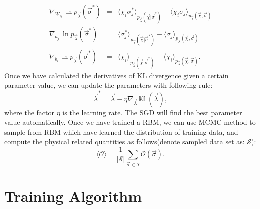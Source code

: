 \documentclass[letterpaper, 10pt]{article}
\newcommand{\qbar}{\rangle}
\newcommand{\qket}{\langle}
\begin{document}
\begin{eqnarray}
\nabla_{W_{ij}} \, \ln{p_{\vec{\lambda}}(\vec{\sigma}^*)} & = & \qket \chi_i \sigma_j^* \qbar_{{p_{\vec{\lambda}}(\vec{\chi} | \vec{\sigma}^*)}} - \qket \chi_i \sigma_j \qbar_{{p_{\vec{\lambda}}(\vec{\chi},\vec{\sigma})}}\label{eq:eq4} \\
\nabla_{a_j} \, \ln{p_{\vec{\lambda}}(\vec{\sigma}^*)} & = & \qket \sigma_j^* \qbar_{{p_{\vec{\lambda}}(\vec{\chi} | \vec{\sigma}^*)}} - \qket \sigma_j \qbar_{{p_{\vec{\lambda}}(\vec{\chi},\vec{\sigma})}}\label{eq:eq5} \\
\nabla_{b_i} \, \ln{p_{\vec{\lambda}}(\vec{\sigma}^*)} & = & \qket \chi_i \qbar_{{p_{\vec{\lambda}}(\vec{\chi} | \vec{\sigma}^*)}} - \qket \chi_i \qbar_{{p_{\vec{\lambda}}(\vec{\chi},\vec{\sigma})}}.\label{eq:eq6}
\end{eqnarray}
Once we have calculated the derivatives of KL divergence given a certain parameter value, we can update the parameters with following rule:
\[ \vec{\lambda}^* = \vec{\lambda} - \eta \nabla_{\vec{\lambda}} \, \mathbb{KL}(\vec{\lambda}), \]
where the factor $\eta$ is the learning rate. The SGD will find the best parameter value automatically. Once we have trained a RBM, we can use MCMC method to sample from RBM which have learned the distribution of training data, and compute the physical related quantities as follows(denote sampled data set as: $\mathcal{S}$):
\[ \qket \mathcal{O} \qbar = \frac{1}{|\mathcal{S}|} \sum_{\vec{\sigma} \in \mathcal{S}} \mathcal{O}(\vec{\sigma}). \]


\section{Training Algorithm}
\end{document}

